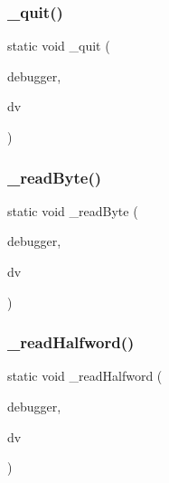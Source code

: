 \subsubsection{\texorpdfstring{\+\_\+quit()}{\_quit()}}
{\footnotesize\ttfamily static void \+\_\+quit (\begin{DoxyParamCaption}\item[{struct C\+L\+I\+Debugger $\ast$}]{debugger,  }\item[{struct C\+L\+I\+Debug\+Vector $\ast$}]{dv }\end{DoxyParamCaption})\hspace{0.3cm}{\ttfamily [static]}}

\mbox{\label{debugger_2cli-debugger_8c_aaca9f6a750269caaf5af45ac030d97ee}} 
\subsubsection{\texorpdfstring{\+\_\+read\+Byte()}{\_readByte()}}
{\footnotesize\ttfamily static void \+\_\+read\+Byte (\begin{DoxyParamCaption}\item[{struct C\+L\+I\+Debugger $\ast$}]{debugger,  }\item[{struct C\+L\+I\+Debug\+Vector $\ast$}]{dv }\end{DoxyParamCaption})\hspace{0.3cm}{\ttfamily [static]}}

\mbox{\label{debugger_2cli-debugger_8c_af10209f39f98d7d0cc72b9d00a556c7a}} 
\subsubsection{\texorpdfstring{\+\_\+read\+Halfword()}{\_readHalfword()}}
{\footnotesize\ttfamily static void \+\_\+read\+Halfword (\begin{DoxyParamCaption}\item[{struct C\+L\+I\+Debugger $\ast$}]{debugger,  }\item[{struct C\+L\+I\+Debug\+Vector $\ast$}]{dv }\end{DoxyParamCaption})\hspace{0.3cm}{\ttfamily [static]}}

